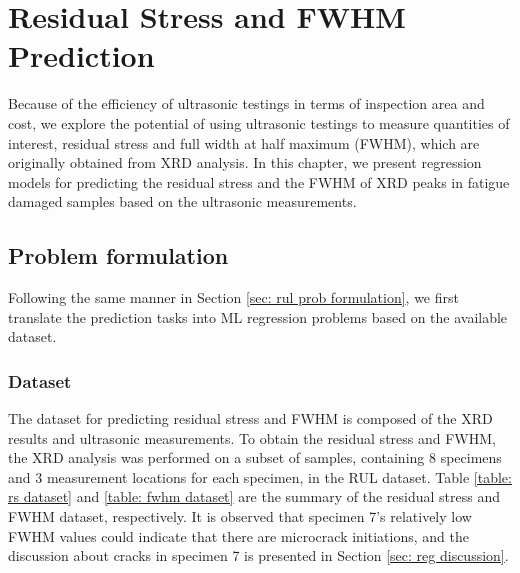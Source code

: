 \chapter{Residual Stress and FWHM Prediction}
\label{chap: reg}

Because of the efficiency of ultrasonic testings in terms of inspection area and cost, we explore the potential of using ultrasonic testings to measure quantities of interest, residual stress and full width at half maximum (FWHM), which are originally obtained from XRD analysis. In this chapter, we present regression models for predicting the residual stress and the FWHM of XRD peaks in fatigue damaged samples based on the ultrasonic measurements. 

\section{Problem formulation}
Following the same manner in Section \ref{sec: rul prob formulation}, we first translate the prediction tasks into ML regression problems based on the available dataset.

\subsection{Dataset}
The dataset for predicting residual stress and FWHM is composed of the XRD results and ultrasonic measurements. To obtain the residual stress and FWHM, the XRD analysis was performed on a subset of samples, containing 8 specimens and 3 measurement locations for each specimen, in the RUL dataset. Table \ref{table: rs dataset} and \ref{table: fwhm dataset} are the summary of the residual stress and FWHM dataset, respectively. It is observed that specimen 7's relatively low FWHM values could indicate that there are microcrack initiations, and the discussion about cracks in specimen 7 is presented in Section \ref{sec: reg discussion}.

